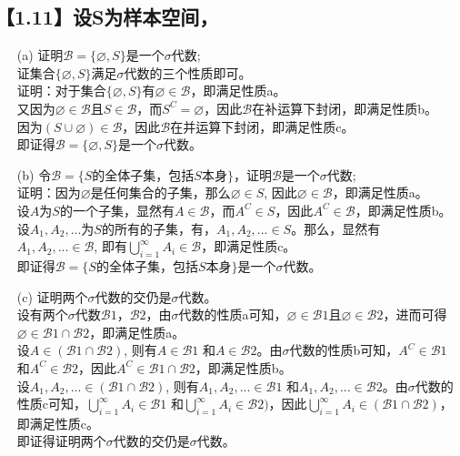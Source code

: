 \documentclass [12pt]{article}
\begin{document}
\begin{CJK*}{GBK}{kai}
\section{【1.11】设S为样本空间， }
\begin{enumerate}
  \item[(a)] 证明$\mathcal{B}=\{\varnothing,S\}$是一个$\sigma$代数;\\
  证集合$\{\varnothing,S\}$满足$\sigma$代数的三个性质即可。\\
  证明：对于集合$\{\varnothing,S\}$有$\varnothing \in \mathcal{B}$，即满足性质a。\\
  又因为$\varnothing \in \mathcal{B}$且$S \in \mathcal{B}$，而$S^{C}=\varnothing$，因此$\mathcal{B}$在补运算下封闭，即满足性质b。\\
  因为$(S \cup \varnothing) \in \mathcal{B}$，因此$\mathcal{B}$在并运算下封闭，即满足性质c。\\
  即证得$\mathcal{B}=\{\varnothing,S\}$是一个$\sigma$代数。
  \item[(b)] 令$\mathcal{B}=\{S的全体子集，包括S本身\}$，证明$\mathcal{B}$是一个$\sigma$代数;\\
  证明：因为$\varnothing$是任何集合的子集，那么$\varnothing \in S$, 因此$\varnothing \in \mathcal{B}$，即满足性质a。\\
  设$A$为$S$的一个子集，显然有$A \in \mathcal{B}$，而$A^{C} \in S$，因此$A^{C} \in \mathcal{B}$，即满足性质b。\\
  设$A_{1}, A_{2},...  $为$S$的所有的子集，有，$A_{1}, A_{2},...  \in S$。那么，显然有$A_{1}, A_{2},...  \in \mathcal{B}$, 即有$\bigcup\limits_{i=1}^{\infty}A_i \in \mathcal{B}$，即满足性质c。\\
   即证得$\mathcal{B}=\{S的全体子集，包括S本身\}$是一个$\sigma$代数。
  \item[(c)] 证明两个$\sigma$代数的交仍是$\sigma$代数。\\
  设有两个$\sigma$代数$\mathcal{B}1$，$\mathcal{B}2$，由$\sigma$代数的性质a可知，$\varnothing \in \mathcal{B}1$且$\varnothing \in \mathcal{B}2$，进而可得$\varnothing \in \mathcal{B}1 \cap \mathcal{B}2$，即满足性质a。\\
  设$A \in (\mathcal{B}1 \cap \mathcal{B}2 )$, 则有$A \in \mathcal{B}1 $ 和$A \in \mathcal{B}2 $。由$\sigma$代数的性质b可知，$A^{C} \in \mathcal{B} 1$ 和$A^{C} \in \mathcal{B}2 $，因此$A^{C} \in \mathcal{B}1 \cap \mathcal{B}2 $，即满足性质b。\\
  设$A_{1}, A_{2},...  \in (\mathcal{B}1 \cap \mathcal{B}2 )$, 则有$A_{1}, A_{2},...  \in \mathcal{B}1 $ 和$A_{1}, A_{2},...  \in \mathcal{B}2 $。由$\sigma$代数的性质c可知，$\bigcup\limits_{i=1}^{\infty}A_i \in \mathcal{B}1 $ 和$\bigcup\limits_{i=1}^{\infty}A_i \in \mathcal{B}2 )$，因此$\bigcup\limits_{i=1}^{\infty}A_i \in (\mathcal{B}1 \cap \mathcal{B}2 )$，即满足性质c。\\
  即证得证明两个$\sigma$代数的交仍是$\sigma$代数。
 \end{enumerate}
 

\end{CJK*}
\end{document}
